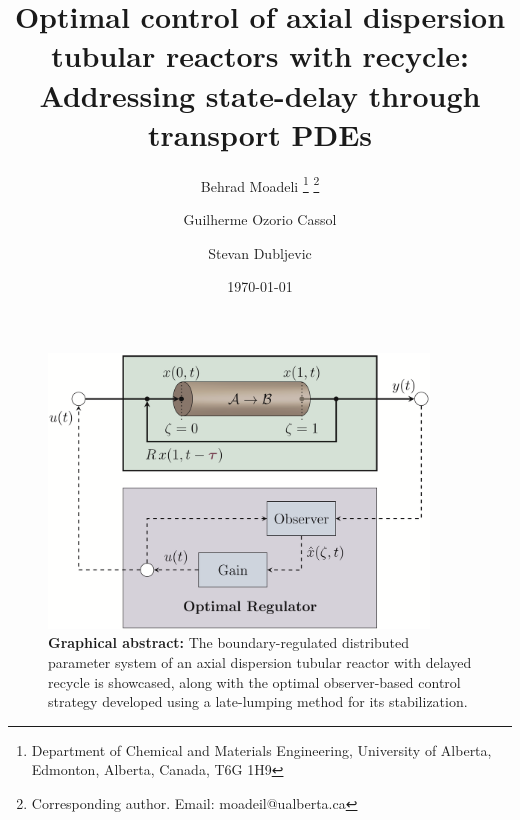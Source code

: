 \documentclass[letterpaper,12pt]{article}
\title{Optimal control of axial dispersion tubular reactors with recycle: Addressing state-delay through transport PDEs}
\author{
  Behrad Moadeli \thanks{Department of Chemical and Materials Engineering, University of Alberta, Edmonton, Alberta, Canada, T6G 1H9} \thanks{Corresponding author. Email: moadeil@ualberta.ca} \and
  Guilherme Ozorio Cassol\footnotemark[1] \and
  Stevan Dubljevic \footnotemark[1] 
  }
\date{\today}
\begin{document}
\maketitle

\begin{figure}[htbp!]
  \centering
  \includegraphics*[width=0.9\textwidth]{Figures/abstract_final.PNG}
  \caption*{\textbf{Graphical abstract:}
  The boundary-regulated distributed parameter system of an axial dispersion tubular reactor with delayed recycle is showcased, along with the optimal observer-based control strategy developed using a late-lumping method for its stabilization.}
\end{figure}
\end{document}

